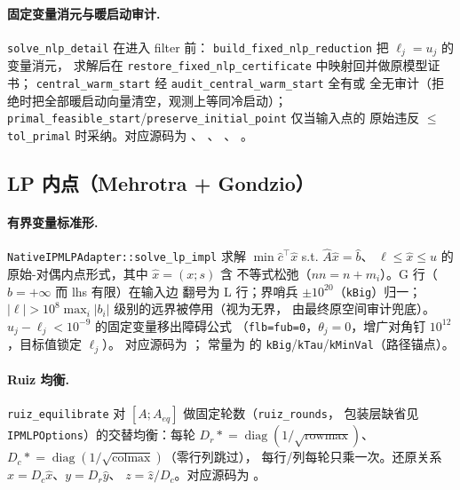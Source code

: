 \paragraph{固定变量消元与暖启动审计.}
\texttt{solve\_nlp\_detail} 在进入 filter 前：
\texttt{build\_fixed\_nlp\_reduction} 把 $\ell_j = u_j$ 的变量消元，
求解后在 \texttt{restore\_fixed\_nlp\_certificate} 中映射回并做原模型证书；
\texttt{central\_warm\_start} 经 \texttt{audit\_central\_warm\_start} 全有或
全无审计（拒绝时把全部暖启动向量清空，观测上等同冷启动）；
\texttt{primal\_feasible\_start}/\texttt{preserve\_initial\_point} 仅当输入点的
原始违反 $\le$ \texttt{tol\_primal} 时采纳。对应源码为
、
、
、
。

\subsection{LP 内点（Mehrotra + Gondzio）}
\label{subsec:engine-ipm-lp}

\paragraph{有界变量标准形.}
\texttt{NativeIPMLPAdapter::solve\_lp\_impl} 求解
$\min \hat c^{\top} \hat x$ s.t. $\hat A \hat x = \hat b$、
$\ell \le \hat x \le u$ 的原始-对偶内点形式，其中 $\hat x = (x; s)$ 含
不等式松弛（$nn = n + m_i$）。G 行（$b = +\infty$ 而 lhs 有限）在输入边
翻号为 L 行；界哨兵 $\pm 10^{20}$（\texttt{kBig}）归一；
$|\ell| > 10^{8} \max_i |b_i|$ 级别的远界被停用（视为无界，
由最终原空间审计兜底）。$u_j - \ell_j < 10^{-9}$ 的固定变量移出障碍公式
（\texttt{flb=fub=0}，$\theta_j = 0$，增广对角钉 $10^{12}$，目标值锁定 $\ell_j$）。
对应源码为 ；
常量为  的
\texttt{kBig}/\texttt{kTau}/\texttt{kMinVal}（路径锚点）。

\paragraph{Ruiz 均衡.}
\texttt{ruiz\_equilibrate} 对 $[A; A_{eq}]$ 做固定轮数（\texttt{ruiz\_rounds}，
包装层缺省见 \texttt{IPMLPOptions}）的交替均衡：每轮
$D_r \mathrel{*}= \operatorname{diag}(1/\sqrt{\mathrm{rowmax}})$、
$D_c \mathrel{*}= \operatorname{diag}(1/\sqrt{\mathrm{colmax}})$（零行列跳过），
每行/列每轮只乘一次。还原关系 $x = D_c \hat x$、$y = D_r \hat y$、
$z = \hat z / D_c$。对应源码为
。

